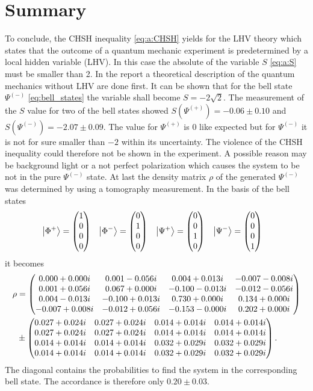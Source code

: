 \section{Summary}
To conclude, the CHSH inequality \eqref{eq:a:CHSH} yields for the LHV theory which states that the outcome of a quantum mechanic experiment is predetermined by a local hidden variable (LHV).
In this case the absolute of the variable $S$ \eqref{eq:a:S} must be smaller than 2.
In the report a theoretical description of the quantum mechanics without LHV are done first.
It can be shown that for the bell state $\Psi^{(-)}$ \eqref{eq:bell_states} the variable shall become $S=-2\sqrt{2}$.
The measurement of the $S$ value for two of the bell states showed $S(\Psi^{(+)})=-0.06\pm0.10$ and $S(\Psi^{(-)})=-2.07\pm0.09$.
The value for $\Psi^{(+)}$ is 0 like expected but for $\Psi^{(-)}$ it is not for sure smaller than $-2$ within its uncertainty.
The violence of the CHSH inequality could therefore not be shown in the experiment.
A possible reason may be background light or a not perfect polarization which causes the system to be not in the pure $\Psi^{(-)}$ state.
At last the density matrix $\rho$ of the generated $\Psi^{(-)}$ was determined by using a tomography measurement.
In the basis of the bell states
\begin{align*}
\ket{\Phi^{+}}
    &=\begin{pmatrix}1\\0\\0\\0\end{pmatrix}
    &\ket{\Phi^{-}}
    &=\begin{pmatrix}0\\1\\0\\0\end{pmatrix}
    &\ket{\Psi^{+}}
    &=\begin{pmatrix}0\\0\\1\\0\end{pmatrix}
    &\ket{\Psi^{-}}
    &=\begin{pmatrix}0\\0\\0\\1\end{pmatrix}
\end{align*}
it becomes
\begin{align*}
\rho
    &=\begin{pmatrix} 0.000+0.000i &0.001-0.056i &0.004+0.013i &-0.007-0.008i\\ 0.001+0.056i &0.067+0.000i &-0.100-0.013i &-0.012-0.056i\\ 0.004-0.013i &-0.100+0.013i &0.730+0.000i &0.134+0.000i\\ -0.007+0.008i &-0.012+0.056i &-0.153-0.000i &0.202+0.000i \end{pmatrix}
    \\
    &\pm \begin{pmatrix} 0.027+0.024i &0.027+0.024i &0.014+0.014i &0.014+0.014i\\ 0.027+0.024i &0.027+0.024i &0.014+0.014i &0.014+0.014i\\ 0.014+0.014i &0.014+0.014i &0.032+0.029i &0.032+0.029i\\ 0.014+0.014i &0.014+0.014i &0.032+0.029i &0.032+0.029i \end{pmatrix} .
\end{align*}
The diagonal contains the probabilities to find the system in the corresponding bell state.
The accordance is therefore only $0.20\pm0.03$.